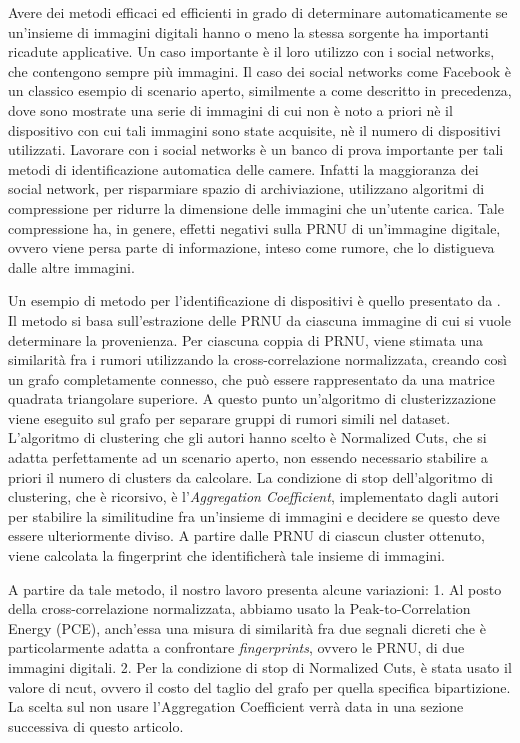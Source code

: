 Avere dei metodi efficaci ed efficienti in grado di determinare automaticamente se un'insieme di immagini digitali hanno o meno la stessa sorgente ha importanti ricadute applicative. Un caso importante è il loro utilizzo con i social networks, che contengono sempre più immagini. Il caso dei social networks come Facebook è un classico esempio di scenario aperto, similmente a come descritto in precedenza, dove sono mostrate una serie di immagini di cui non è noto a priori nè il dispositivo con cui tali immagini sono state acquisite, nè il numero di dispositivi utilizzati. Lavorare con i social networks è un banco di prova importante per tali metodi di identificazione automatica delle camere. Infatti la maggioranza dei social network, per risparmiare spazio di archiviazione, utilizzano algoritmi di compressione per ridurre la dimensione delle immagini che un'utente carica. Tale compressione ha, in genere, effetti negativi sulla PRNU di un'immagine digitale, ovvero viene persa parte di informazione, inteso come rumore, che lo distigueva dalle altre immagini.

Un esempio di metodo per l'identificazione di dispositivi è quello presentato da \cite{Amerini2014831}. Il metodo si basa sull'estrazione delle PRNU da ciascuna immagine di cui si vuole determinare la provenienza. Per ciascuna coppia di PRNU, viene stimata una similarità fra i rumori utilizzando la cross-correlazione normalizzata, creando così un grafo completamente connesso, che può essere rappresentato da una matrice quadrata triangolare superiore. A questo punto un'algoritmo di clusterizzazione viene eseguito sul grafo per separare gruppi di rumori simili nel dataset. L'algoritmo di clustering che gli autori hanno scelto è Normalized Cuts, che si adatta perfettamente ad un scenario aperto, non essendo necessario stabilire a priori il numero di clusters da calcolare. La condizione di stop dell'algoritmo di clustering, che è ricorsivo, è l'\emph{Aggregation Coefficient}, implementato dagli autori per stabilire la similitudine fra un'insieme di immagini e decidere se questo deve essere ulteriormente diviso. A partire dalle PRNU di ciascun cluster ottenuto, viene calcolata la fingerprint che identificherà tale insieme di immagini.

A partire da tale metodo, il nostro lavoro presenta alcune variazioni:
1. Al posto della cross-correlazione normalizzata, abbiamo usato la Peak-to-Correlation Energy (PCE), anch'essa una misura di similarità fra due segnali dicreti che è particolarmente adatta a confrontare \emph{fingerprints}, ovvero le PRNU, di due immagini digitali.
2. Per la condizione di stop di Normalized Cuts, è stata usato il valore di ncut, ovvero il costo del taglio del grafo per quella specifica bipartizione. La scelta sul non usare l'Aggregation Coefficient verrà data in una sezione successiva di questo articolo.

